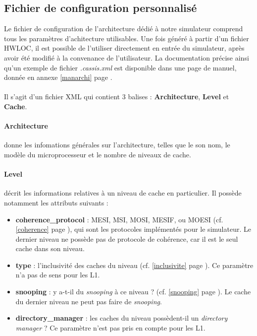 \subsection{Fichier de configuration personnalisé}
\label{config}
Le fichier de configuration de l'architecture dédié à notre simulateur comprend tous les paramètres d'achitecture utilisables. Une fois généré à partir d'un fichier \textsf{HWLOC}, il est possible de l'utiliser directement en entrée du simulateur, après avoir été modifié à la convenance de l'utilisateur. La documentation précise ainsi qu'un exemple de fichier \textit{.cassis.xml} est disponible dans une page de manuel, donnée en annexe \ref{manarchi} page \pageref{manarchi}.

\paragraph{}
Il s'agit d'un fichier XML qui contient 3 balises : \textbf{Architecture}, \textbf{Level} et \textbf{Cache}.

\paragraph{Architecture} donne les infomations générales sur l'architecture, telles que le son nom, le modèle du microprocesseur et le nombre de niveaux de cache.

\paragraph{Level} décrit les informations relatives à un niveau de cache en particulier. Il possède notamment les attributs suivants :
\begin{itemize}
  \item \textbf{coherence\_protocol} : MESI, MSI, MOSI, MESIF, ou MOESI (cf. \ref{coherence} page \pageref{coherence}), qui sont les protocoles implémentés pour le simulateur. Le dernier niveau ne possède pas de protocole de cohérence, car il est le seul cache dans son niveau.
  \item \textbf{type} : l'inclusivité des caches du niveau (cf. \ref{inclusivite} page \pageref{inclusivite}). Ce paramètre n'a pas de sens pour les L1.
  \item \textbf{snooping} : y a-t-il du \emph{snooping} à ce niveau ? (cf. \ref{snooping} page \pageref{snooping}). Le cache du dernier niveau ne peut pas faire de \emph{snooping}.
  \item \textbf{directory\_manager} : les caches du niveau possèdent-il un \emph{directory manager} ? Ce paramètre n'est pas pris en compte pour les L1.
\end{itemize}

